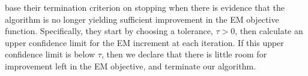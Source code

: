 \documentclass[11pt, oneside]{article}   	%
\begin{document}
\citeauthor{Caf05} base their termination criterion on stopping when there is evidence that the algorithm is no longer yielding sufficient improvement in the EM objective function. Specifically, they start by choosing a tolerance, $\tau>0$, then calculate an upper confidence limit for the EM increment at each iteration. If this upper confidence limit is below $\tau$, then we declare that there is little room for improvement left in the EM objective, and terminate our algorithm.

\begin{comment}
\subsection{Quantifying Monte Carlo Uncertainty}

In their seminal work, \citet{Wei90} highlight two important challenges with implementing this method: choosing the Monte Carlo sample size at each iteration, and deciding when to terminate the algorithm. It turns out that solutions to these two problems are often connected via their link to the uncertainty in our Monte Carlo conditional expectations. The recommendations given by \citeauthor{Wei90} on how to solve these problems are mostly informal, but much of the later work on the MCEM algorithm centers around developing more precise solutions \hl{(too strong of a statement?)}.

\citet{Cha95} present an alternative method for choosing the Monte Carlo sample size based on starting with a pilot study and using information near the optimal parameter estimate\footnotemark to choose a Monte Carlo size for the rest of the analysis. In contrast to \citet{Wei90}, \citeauthor{Cha95} use a fixed Monte Carlo size for their analysis.

\footnotetext{\citet{Cha95} present an identity which expresses the observed data log-likelihood ratio as the conditional expectation of the corresponding complete data log-likelihood ratio. Replacing the conditional expectation with a Monte Carlo average gives a natural estimate of the observed data log-likelihood ratio. This approach closely resembles the Monte Carlo Maximum Likelihood method of \citet{Gey94}. See \hl{Section ???}.}

The method of \citet{Boo99} centers on treating each iteration of the MCEM algorithm as an M-estimation problem targeting the deterministic EM update. This framework is quite natural, as an iteration of the MCEM algorithm consists of maximizing a Monte Carlo approximation to the EM objective function. Provided that certain regularity conditions are satisfied (see, e.g., \citealp{van98}), we can estimate the asymptotic standard error of the MCEM update as an estimate of the EM update with the same starting value, with the sampling variability induced by Monte Carlo simulation. \citeauthor{Boo99} then recommend constructing an asymptotic confidence set for the EM update, and increasing the Monte Carlo size if this confidence set contains the previous iteration's parameter estimate\footnotemark.


\end{comment}
\end{document}
